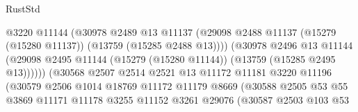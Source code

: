 \begin{lexlean}{RustStd}
\begin{coremodule}
                                          @3220
                                          @11144
                                          (@30978
                                            @2489
                                            @13
                                            @11137
                                            (@29098
                                              @2488
                                              @11137
                                              (@15279 (@15280 @11137))
                                              (@13759 (@15285 @2488 @13))))
                                          (@30978
                                            @2496
                                            @13
                                            @11144
                                            (@29098
                                              @2495
                                              @11144
                                              (@15279 (@15280 @11144))
                                              (@13759 (@15285 @2495 @13))))))
                                      (@30568
                                        @2507
                                        @2514
                                        @2521
                                        @13
                                        @11172
                                        @11181
                                        @3220
                                        @11196
                                        (@30579
                                          @2506
                                          @1014
                                          @18769
                                          @11172
                                          @11179
                                          @8669
                                          (@30588
                                            @2505
                                            @53
                                            @55
                                            @3869
                                            @11171
                                            @11178
                                            @3255
                                            @11152
                                            @3261
                                            @29076
                                            (@30587
                                              @2503
                                              @103
                                              @53

\end{coremodule}
\end{lexlean}
